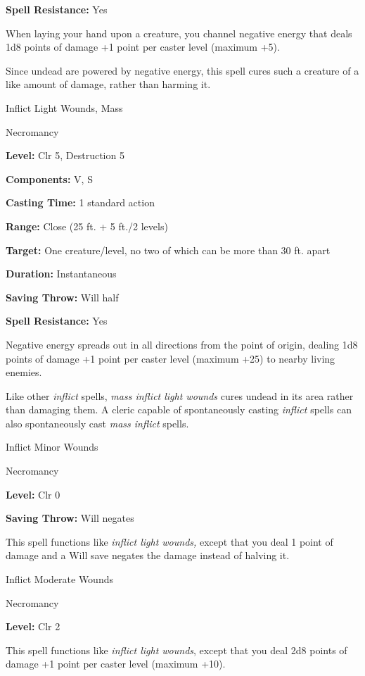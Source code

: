 \documentclass{article}
\begin{document}
\textbf{Spell Resistance:} Yes

When laying your hand upon a creature, you channel negative energy that deals 1d8 
points of damage +1 point per caster level (maximum +5).

Since undead are powered by negative energy, this spell cures such a creature of 
a like amount of damage, rather than harming it.

\vspace{12pt}
Inflict Light Wounds, Mass

Necromancy

\textbf{Level:} Clr 5, Destruction 5

\textbf{Components:} V, S

\textbf{Casting Time:} 1 standard action

\textbf{Range:} Close (25 ft. + 5 ft./2 levels)

\textbf{Target:} One creature/level, no two of which can be more than 30 ft. apart

\textbf{Duration:} Instantaneous

\textbf{Saving Throw: }Will half

\textbf{Spell Resistance:} Yes

Negative energy spreads out in all directions from the point of origin, dealing 
1d8 points of damage +1 point per caster level (maximum +25) to nearby living enemies.

Like other \textit{inflict }spells, \textit{mass inflict light wounds }cures undead 
in its area rather than damaging them. A cleric capable of spontaneously casting 
\textit{inflict }spells can also spontaneously cast \textit{mass inflict }spells.

\vspace{12pt}
Inflict Minor Wounds

Necromancy

\textbf{Level:} Clr 0

\textbf{Saving Throw: }Will negates

This spell functions like \textit{inflict light wounds, }except that you deal 1 
point of damage and a Will save negates the damage instead of halving it.

\vspace{12pt}
Inflict Moderate Wounds

Necromancy

\textbf{Level:} Clr 2

This spell functions like \textit{inflict light wounds}, except that you deal 2d8 
points of damage +1 point per caster level (maximum +10).
\end{document}
